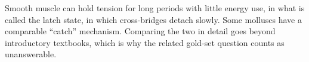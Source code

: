 \begin{background}
Smooth muscle can hold tension for long periods with little energy use, in what is called the latch state, in which cross-bridges detach slowly. Some molluscs have a comparable \enquote{catch} mechanism. Comparing the two in detail goes beyond introductory textbooks, which is why the related gold-set question counts as unanswerable.
\end{background}
